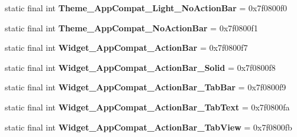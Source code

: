 \begin{DoxyCompactItemize}
\item 
\hypertarget{classandroid_1_1support_1_1design_1_1_r_1_1style_add69b6a7a05e046750100674904246de}{}static final int {\bfseries Theme\+\_\+\+App\+Compat\+\_\+\+Light\+\_\+\+No\+Action\+Bar} = 0x7f0800f0\label{classandroid_1_1support_1_1design_1_1_r_1_1style_add69b6a7a05e046750100674904246de}

\item 
\hypertarget{classandroid_1_1support_1_1design_1_1_r_1_1style_a908dbe9e5db2dcaaa875b2b3076e6986}{}static final int {\bfseries Theme\+\_\+\+App\+Compat\+\_\+\+No\+Action\+Bar} = 0x7f0800f1\label{classandroid_1_1support_1_1design_1_1_r_1_1style_a908dbe9e5db2dcaaa875b2b3076e6986}

\item 
\hypertarget{classandroid_1_1support_1_1design_1_1_r_1_1style_ac6fabcbdfed53c737b1f84943d09135e}{}static final int {\bfseries Widget\+\_\+\+App\+Compat\+\_\+\+Action\+Bar} = 0x7f0800f7\label{classandroid_1_1support_1_1design_1_1_r_1_1style_ac6fabcbdfed53c737b1f84943d09135e}

\item 
\hypertarget{classandroid_1_1support_1_1design_1_1_r_1_1style_ab97887a30acd25327d0b7891149466a8}{}static final int {\bfseries Widget\+\_\+\+App\+Compat\+\_\+\+Action\+Bar\+\_\+\+Solid} = 0x7f0800f8\label{classandroid_1_1support_1_1design_1_1_r_1_1style_ab97887a30acd25327d0b7891149466a8}

\item 
\hypertarget{classandroid_1_1support_1_1design_1_1_r_1_1style_ae40e99b212bec9e1c06063f41df88461}{}static final int {\bfseries Widget\+\_\+\+App\+Compat\+\_\+\+Action\+Bar\+\_\+\+Tab\+Bar} = 0x7f0800f9\label{classandroid_1_1support_1_1design_1_1_r_1_1style_ae40e99b212bec9e1c06063f41df88461}

\item 
\hypertarget{classandroid_1_1support_1_1design_1_1_r_1_1style_acd485e388828fa5a420f5e50cfcd5c88}{}static final int {\bfseries Widget\+\_\+\+App\+Compat\+\_\+\+Action\+Bar\+\_\+\+Tab\+Text} = 0x7f0800fa\label{classandroid_1_1support_1_1design_1_1_r_1_1style_acd485e388828fa5a420f5e50cfcd5c88}

\item 
\hypertarget{classandroid_1_1support_1_1design_1_1_r_1_1style_a534241f1a7151bbcf5762714684ab67c}{}static final int {\bfseries Widget\+\_\+\+App\+Compat\+\_\+\+Action\+Bar\+\_\+\+Tab\+View} = 0x7f0800fb\label{classandroid_1_1support_1_1design_1_1_r_1_1style_a534241f1a7151bbcf5762714684ab67c}


\end{DoxyCompactItemize}
